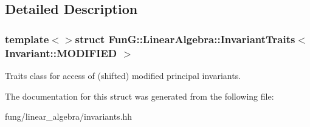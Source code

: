 \subsection{Detailed Description}
\subsubsection*{template$<$$>$struct Fun\-G\-::\-Linear\-Algebra\-::\-Invariant\-Traits$<$ Invariant\-::\-M\-O\-D\-I\-F\-I\-E\-D $>$}

Traits class for access of (shifted) modified principal invariants. 

The documentation for this struct was generated from the following file\-:\begin{DoxyCompactItemize}
\item 
fung/linear\-\_\-algebra/invariants.\-hh\end{DoxyCompactItemize}

